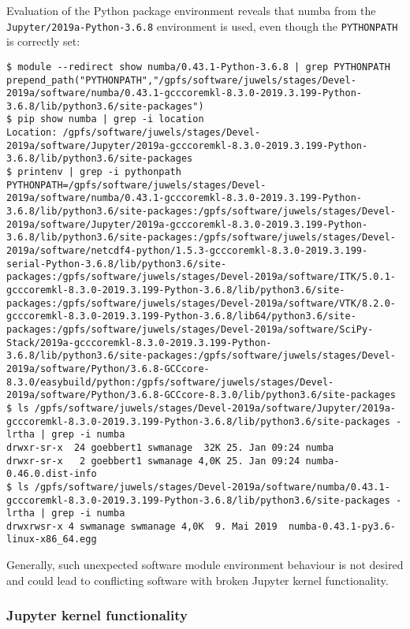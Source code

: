 \documentclass[11pt,a4paper]{article}
\begin{document}
Evaluation of the Python package environment reveals that numba from the \verb|Jupyter/2019a-Python-3.6.8| environment is used, even though the \verb|PYTHONPATH| is correctly set:
%
\begin{verbatim}
$ module --redirect show numba/0.43.1-Python-3.6.8 | grep PYTHONPATH
prepend_path("PYTHONPATH","/gpfs/software/juwels/stages/Devel-2019a/software/numba/0.43.1-gcccoremkl-8.3.0-2019.3.199-Python-3.6.8/lib/python3.6/site-packages")
$ pip show numba | grep -i location
Location: /gpfs/software/juwels/stages/Devel-2019a/software/Jupyter/2019a-gcccoremkl-8.3.0-2019.3.199-Python-3.6.8/lib/python3.6/site-packages
$ printenv | grep -i pythonpath
PYTHONPATH=/gpfs/software/juwels/stages/Devel-2019a/software/numba/0.43.1-gcccoremkl-8.3.0-2019.3.199-Python-3.6.8/lib/python3.6/site-packages:/gpfs/software/juwels/stages/Devel-2019a/software/Jupyter/2019a-gcccoremkl-8.3.0-2019.3.199-Python-3.6.8/lib/python3.6/site-packages:/gpfs/software/juwels/stages/Devel-2019a/software/netcdf4-python/1.5.3-gcccoremkl-8.3.0-2019.3.199-serial-Python-3.6.8/lib/python3.6/site-packages:/gpfs/software/juwels/stages/Devel-2019a/software/ITK/5.0.1-gcccoremkl-8.3.0-2019.3.199-Python-3.6.8/lib/python3.6/site-packages:/gpfs/software/juwels/stages/Devel-2019a/software/VTK/8.2.0-gcccoremkl-8.3.0-2019.3.199-Python-3.6.8/lib64/python3.6/site-packages:/gpfs/software/juwels/stages/Devel-2019a/software/SciPy-Stack/2019a-gcccoremkl-8.3.0-2019.3.199-Python-3.6.8/lib/python3.6/site-packages:/gpfs/software/juwels/stages/Devel-2019a/software/Python/3.6.8-GCCcore-8.3.0/easybuild/python:/gpfs/software/juwels/stages/Devel-2019a/software/Python/3.6.8-GCCcore-8.3.0/lib/python3.6/site-packages
$ ls /gpfs/software/juwels/stages/Devel-2019a/software/Jupyter/2019a-gcccoremkl-8.3.0-2019.3.199-Python-3.6.8/lib/python3.6/site-packages -lrtha | grep -i numba
drwxr-sr-x  24 goebbert1 swmanage  32K 25. Jan 09:24 numba
drwxr-sr-x   2 goebbert1 swmanage 4,0K 25. Jan 09:24 numba-0.46.0.dist-info
$ ls /gpfs/software/juwels/stages/Devel-2019a/software/numba/0.43.1-gcccoremkl-8.3.0-2019.3.199-Python-3.6.8/lib/python3.6/site-packages -lrtha | grep -i numba
drwxrwsr-x 4 swmanage swmanage 4,0K  9. Mai 2019  numba-0.43.1-py3.6-linux-x86_64.egg
\end{verbatim}

Generally, such unexpected software module environment behaviour is not desired and could lead to conflicting software with broken Jupyter kernel functionality.

\subsubsection{Jupyter kernel functionality}
\end{document}
